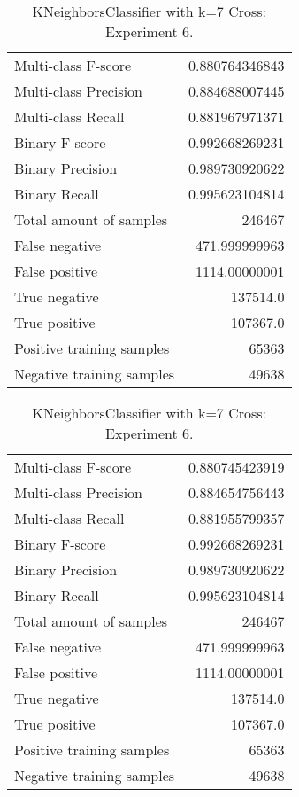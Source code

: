 \begin{table}[H]
\begin{minipage}{0.5\textwidth}
\caption{KNeighborsClassifier with k=7 Cross: Experiment 5.}
\centering
\begin{tabular}{l r}
\toprule
Multi-class F-score & 0.880764346843 \\
Multi-class Precision & 0.884688007445 \\
Multi-class Recall & 0.881967971371 \\
\midrule
Binary F-score & 0.992668269231 \\
Binary Precision & 0.989730920622 \\
Binary Recall & 0.995623104814 \\
\midrule
Total amount of samples & 246467 \\
False negative & 471.999999963 \\
False positive & 1114.00000001 \\
True negative & 137514.0 \\
True positive & 107367.0 \\
\midrule
Positive training samples & 65363 \\
Negative training samples & 49638 \\
\bottomrule
\end{tabular}
\end{minipage}
\hfillx
\begin{minipage}{0.5\textwidth}
\caption{KNeighborsClassifier with k=7 Cross: Experiment 6.}
\centering
\begin{tabular}{l r}
\toprule
Multi-class F-score & 0.880745423919 \\
Multi-class Precision & 0.884654756443 \\
Multi-class Recall & 0.881955799357 \\
\midrule
Binary F-score & 0.992668269231 \\
Binary Precision & 0.989730920622 \\
Binary Recall & 0.995623104814 \\
\midrule
Total amount of samples & 246467 \\
False negative & 471.999999963 \\
False positive & 1114.00000001 \\
True negative & 137514.0 \\
True positive & 107367.0 \\
\midrule
Positive training samples & 65363 \\
Negative training samples & 49638 \\
\bottomrule
\end{tabular}
\end{minipage}
\end{table}
